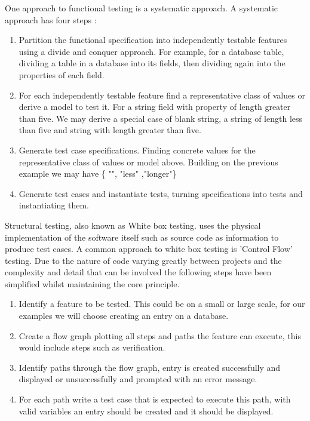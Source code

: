 \documentclass[a4paper,12pt]{article}
\begin{document}
\vspace{3mm}
\par One approach to functional testing is a systematic approach. A systematic approach has four steps :\cite{young2008software}
\vspace{3mm}
\begin{enumerate}
\item Partition the functional specification into independently testable features using a divide and conquer approach. For example, for a database table, dividing a table in a database into its fields, then dividing again into the properties of each field. 
\item For each independently testable feature find a representative class of values or derive a model to test it. For a string field with property of length greater than five. We may derive a special case of blank string, a string of length less than five and string with length greater than five.
\item Generate test case specifications. Finding concrete values for the representative class of values or model above. Building on the previous example we may have \{ "", "less" ,"longer"\}
\item Generate test cases and instantiate tests, turning specifications into tests and instantiating them.
\end{enumerate}
\vspace{3mm}
\par Structural testing, also known as White box testing. uses the physical implementation of the software itself such as source code as information to produce test cases. A common approach to white box testing is 'Control Flow' testing. Due to the nature of code varying greatly between projects and the complexity and detail that can be involved the following steps have been simplified whilst maintaining the core principle.
\vspace{3mm}
\begin{enumerate}
\item Identify a feature to be tested. This could be on a small or large scale, for our examples we will choose creating an entry on a database.
\item Create a flow graph plotting all steps and paths the feature can execute, this would include steps such as verification.
\item Identify paths through the flow graph, entry is created successfully and displayed or unsuccessfully and prompted with an error message.
\item For each path write a test case that is expected to execute this path, with valid variables an entry should be created and it should be displayed.
\end{enumerate}
\end{document}
